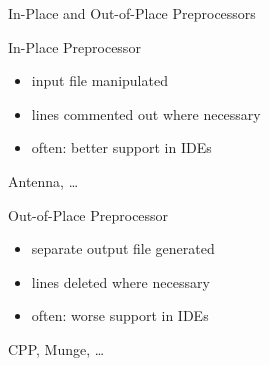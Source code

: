 \begin{frame}{In-Place and Out-of-Place Preprocessors \mytitlesource{\featureide}}
	\begin{mycolumns}[T]
		\begin{note}{In-Place Preprocessor}
			\begin{itemize}
				\item input file manipulated
				\item lines commented out where necessary
				\item often: better support in IDEs
			\end{itemize}
		\end{note}
		\begin{exampletight}{Antenna, \ldots}
		\end{exampletight}
	\mynextcolumn
		\begin{note}{Out-of-Place Preprocessor}
			\begin{itemize}
				\item separate output file generated
				\item lines deleted where necessary
				\item often: worse support in IDEs
			\end{itemize}
		\end{note}
		\begin{exampletight}{CPP, Munge, \ldots}
		\end{exampletight}
	\end{mycolumns}
\end{frame}

